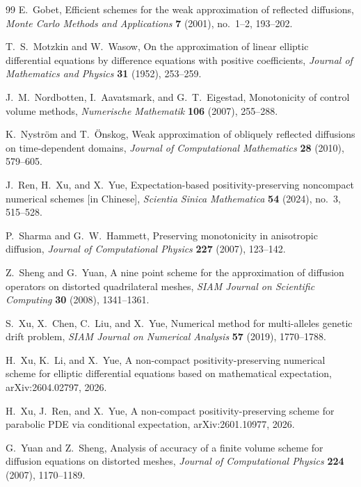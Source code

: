 \documentclass[11pt]{article}
\theoremstyle{definition}
\theoremstyle{remark}
\begin{document}
\begin{thebibliography}{99}
		E.~Gobet,
		Efficient schemes for the weak approximation of reflected diffusions,
		\emph{Monte Carlo Methods and Applications} \textbf{7} (2001),
		no.~1--2, 193--202.
		
		T.~S.~Motzkin and W.~Wasow,
		On the approximation of linear elliptic differential equations by difference equations with positive coefficients,
		\emph{Journal of Mathematics and Physics} \textbf{31} (1952), 253--259.
		
		J.~M.~Nordbotten, I.~Aavatsmark, and G.~T.~Eigestad,
		Monotonicity of control volume methods,
		\emph{Numerische Mathematik} \textbf{106} (2007), 255--288.
		
		K.~Nystr\"om and T.~\"Onskog,
		Weak approximation of obliquely reflected diffusions on time-dependent domains,
		\emph{Journal of Computational Mathematics} \textbf{28} (2010), 579--605.
		
		J.~Ren, H.~Xu, and X.~Yue,
		Expectation-based positivity-preserving noncompact numerical schemes [in Chinese],
		\emph{Scientia Sinica Mathematica} \textbf{54} (2024), no.~3, 515--528.
		
		P.~Sharma and G.~W.~Hammett,
		Preserving monotonicity in anisotropic diffusion,
		\emph{Journal of Computational Physics} \textbf{227} (2007), 123--142.
		
		Z.~Sheng and G.~Yuan,
		A nine point scheme for the approximation of diffusion operators on distorted quadrilateral meshes,
		\emph{SIAM Journal on Scientific Computing} \textbf{30} (2008), 1341--1361.
		
		S.~Xu, X.~Chen, C.~Liu, and X.~Yue,
		Numerical method for multi-alleles genetic drift problem,
		\emph{SIAM Journal on Numerical Analysis} \textbf{57} (2019), 1770--1788.
		
		H.~Xu, K.~Li, and X.~Yue,
		A non-compact positivity-preserving numerical scheme for elliptic differential equations based on mathematical expectation,
		arXiv:2604.02797, 2026.
		
		H.~Xu, J.~Ren, and X.~Yue,
		A non-compact positivity-preserving scheme for parabolic PDE via conditional expectation,
		arXiv:2601.10977, 2026.
		
		G.~Yuan and Z.~Sheng,
		Analysis of accuracy of a finite volume scheme for diffusion equations on distorted meshes,
		\emph{Journal of Computational Physics} \textbf{224} (2007), 1170--1189.
		

\end{thebibliography}
\end{document}
